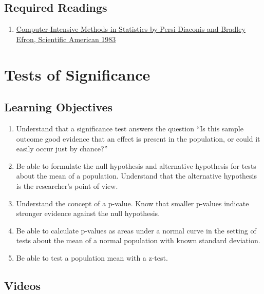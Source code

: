 \documentclass[letterpaper,10pt,twocolumn,twoside,printwatermark=false]{pinp}
\providecommand{\tightlist}{%
  \setlength{\itemsep}{0pt}\setlength{\parskip}{0pt}}
\begin{document}
\hypertarget{required-readings}{%
\subsection{Required Readings}\label{required-readings}}

\begin{enumerate}
\item \href{https://www.dropbox.com/s/cxiq70zxxtyxlb5/EfronDiaconisBootstrap.pdf?dl=0}{Computer-Intensive Methods in Statistics by Persi Diaconis and Bradley Efron, Scientific American 1983}
\end{enumerate}

\vspace*{0.25cm}

\hypertarget{tests-of-significance}{%
\section{Tests of Significance}\label{tests-of-significance}}

\hypertarget{learning-objectives-1}{%
\subsection{Learning Objectives}\label{learning-objectives-1}}

\begin{enumerate}
\def\labelenumi{\arabic{enumi}.}
\tightlist
\item
  Understand that a significance test answers the question ``Is this
  sample outcome good evidence that an effect is present in the
  population, or could it easily occur just by chance?''
\item
  Be able to formulate the null hypothesis and alternative hypothesis
  for tests about the mean of a population. Understand that the
  alternative hypothesis is the researcher's point of view.
\item
  Understand the concept of a p-value. Know that smaller p-values
  indicate stronger evidence against the null hypothesis.
\item
  Be able to calculate p-values as areas under a normal curve in the
  setting of tests about the mean of a normal population with known
  standard deviation.
\item
  Be able to test a population mean with a z-test.
\end{enumerate}

\hypertarget{videos}{%
\subsection{Videos}\label{videos}}
\end{document}
